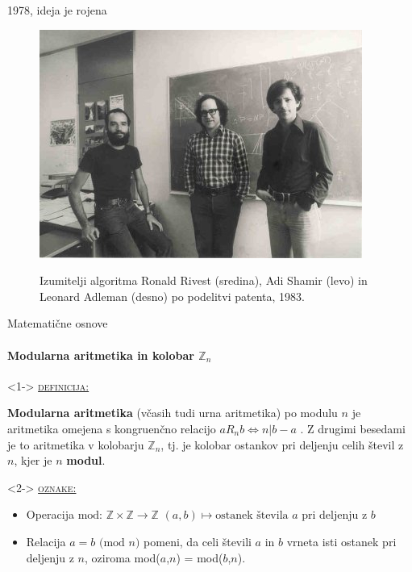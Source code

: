 \documentclass[a4paper, 12pt]{beamer} %
\newcommand{\Zn}{\mathbb{Z}_n}
\newenvironment{matematika}[1]{
\textcolor{bostonuniversityred}{\underline{\textsc{#1:}}}
}{
}
\begin{document}
\begin{frame}{1978, ideja je rojena}
\begin{figure}
\centering
\includegraphics[scale=1.2]{rsa_inventors}
\label{fig:inventors}
\caption{Izumitelji algoritma Ronald \alert{R}ivest (sredina), Adi \alert{S}hamir (levo) in Leonard \alert{A}dleman (desno) po podelitvi patenta, 1983.}
\end{figure}
\end{frame}

\begin{frame}{Matematične osnove}
\framesubtitle{Modularna aritmetika in kolobar $\Zn$}
\begin{block}<1->{}
\begin{matematika}{definicija}
\textbf{Modularna aritmetika} (včasih tudi urna aritmetika) po modulu $n$ je aritmetika omejena s kongruenčno relacijo $a R_n b \iff n | b - a$ .
\newline
\newline
Z drugimi besedami je to aritmetika v kolobarju $\Zn$, tj. je kolobar ostankov pri deljenju celih števil z $n$, kjer je $n$ \textbf{modul}.
\end{matematika}
\end{block}

\begin{block}<2->{}
\begin{matematika}{oznake}
\newline
\begin{itemize}[label=]
\item Operacija $\text{mod: } \mathbb{Z} \times \mathbb{Z} \to \mathbb{Z}$ $(a, b) \mapsto \text{ostanek števila } a \text{ pri deljenju z } b$
\item Relacija $a = b \text{ (mod } n)$ pomeni, da celi števili $a$ in $b$ vrneta isti ostanek pri deljenju z $n$, oziroma mod($a$,$n$) = mod($b$,$n$).
\end{itemize}
\end{matematika}
\end{block}
\end{frame}
\end{document}
